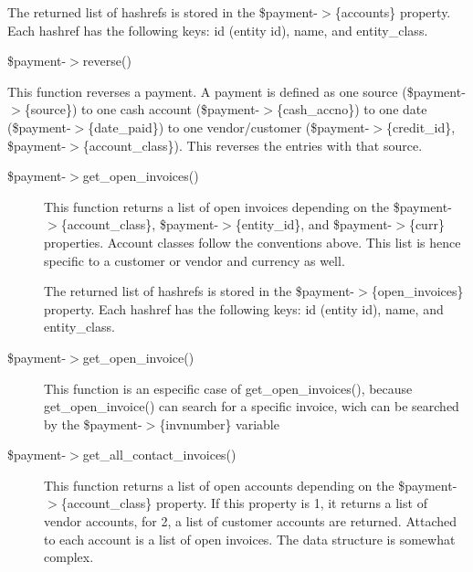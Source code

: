 \begin{description}
\begin{description}
\begin{description}
\begin{description}
\begin{description}
\begin{description}
\begin{description}
\begin{description}
\begin{description}
\begin{description}
The returned list of hashrefs is stored in the \$payment-$>$\{accounts\} property.
Each hashref has the following keys:  id (entity id), name, and entity\_class.

\end{description}
\$payment-$>$reverse()



This function reverses a payment.  A payment is defined as one source 
(\$payment-$>$\{source\}) to one cash account (\$payment-$>$\{cash\_accno\}) to one date 
(\$payment-$>$\{date\_paid\}) to one vendor/customer (\$payment-$>$\{credit\_id\}, 
\$payment-$>$\{account\_class\}).  This reverses the entries with that source.

\begin{description}

\item[{\$payment-$>$get\_open\_invoices()}] \mbox{}

This function returns a list of open invoices depending on the 
\$payment-$>$\{account\_class\}, \$payment-$>$\{entity\_id\}, and \$payment-$>$\{curr\} 
properties.  Account classes follow the conventions above.  This list is hence
specific to a customer or vendor and currency as well.



The returned list of hashrefs is stored in the \$payment-$>$\{open\_invoices\} 
property. Each hashref has the following keys:  id (entity id), name, and 
entity\_class.

\end{description}
\begin{description}

\item[{\$payment-$>$get\_open\_invoice()}] \mbox{}

This function is an especific case of get\_open\_invoices(), because get\_open\_invoice() 
can search for a specific invoice, wich can be searched by the \$payment-$>$\{invnumber\} 
variable

\end{description}
\begin{description}

\item[{\$payment-$>$get\_all\_contact\_invoices()}] \mbox{}

This function returns a list of open accounts depending on the 
\$payment-$>$\{account\_class\} property.  If this property is 1, it returns a list 
of vendor accounts, for 2, a list of customer accounts are returned.  Attached
to each account is a list of open invoices.  The data structure is somewhat 
complex.




\end{description}
\end{description}
\end{description}
\end{description}
\end{description}
\end{description}
\end{description}
\end{description}
\end{description}
\end{description}
